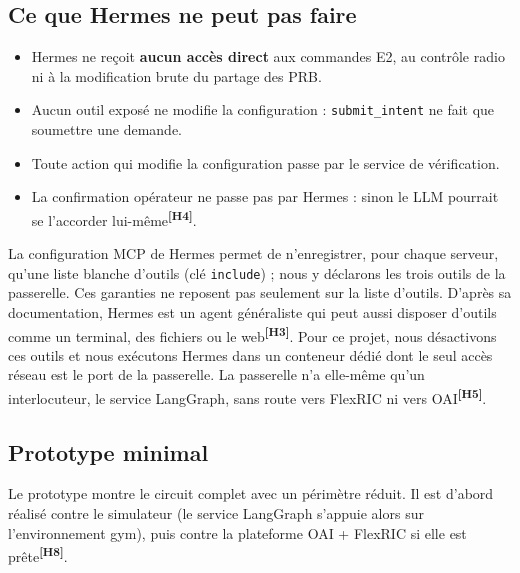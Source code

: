 \documentclass[11pt,a4paper]{article}
\newcommand{\hyp}[1]{\textsuperscript{\textbf{[H#1]}}}
\newcommand{\tool}[1]{\texttt{#1}}
\begin{document}
\subsection{Ce que Hermes ne peut pas faire}

\begin{itemize}
  \item Hermes ne reçoit \textbf{aucun accès direct} aux commandes E2, au contrôle radio ni à
        la modification brute du partage des PRB.
  \item Aucun outil exposé ne modifie la configuration : \tool{submit\_intent} ne fait que
        soumettre une demande.
  \item Toute action qui modifie la configuration passe par le service de vérification.
  \item La confirmation opérateur ne passe pas par Hermes : sinon le LLM pourrait se
        l'accorder lui-même\hyp{4}.
\end{itemize}

La configuration MCP de Hermes permet de n'enregistrer, pour chaque serveur, qu'une liste
blanche d'outils (clé \tool{include}) ; nous y déclarons les trois outils de la passerelle.
Ces garanties ne reposent pas seulement sur la liste d'outils. D'après sa documentation,
Hermes est un agent généraliste qui peut aussi disposer d'outils comme un terminal, des
fichiers ou le web\hyp{3}. Pour ce projet, nous désactivons ces outils et nous exécutons
Hermes dans un conteneur dédié dont le seul accès réseau est le port de la passerelle. La
passerelle n'a elle-même qu'un interlocuteur, le service LangGraph, sans route vers FlexRIC
ni vers OAI\hyp{5}.

\subsection{Prototype minimal}

Le prototype montre le circuit complet avec un périmètre réduit. Il est d'abord réalisé
contre le simulateur (le service LangGraph s'appuie alors sur l'environnement gym), puis
contre la plateforme OAI + FlexRIC si elle est prête\hyp{8}.
\end{document}
